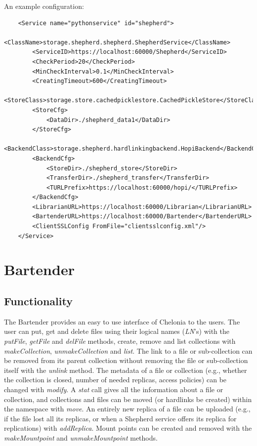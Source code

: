 \documentclass{book}
\begin{document}
An example configuration:

\begin{verbatim}
    <Service name="pythonservice" id="shepherd">
        <ClassName>storage.shepherd.shepherd.ShepherdService</ClassName>
        <ServiceID>https://localhost:60000/Shepherd</ServiceID>
        <CheckPeriod>20</CheckPeriod>
        <MinCheckInterval>0.1</MinCheckInterval>
        <CreatingTimeout>600</CreatingTimeout>
        <StoreClass>storage.store.cachedpicklestore.CachedPickleStore</StoreClass>
        <StoreCfg>
            <DataDir>./shepherd_data1</DataDir>
        </StoreCfg>
        <BackendClass>storage.shepherd.hardlinkingbackend.HopiBackend</BackendClass>
        <BackendCfg>
            <StoreDir>./shepherd_store</StoreDir>
            <TransferDir>./shepherd_transfer</TransferDir>
            <TURLPrefix>https://localhost:60000/hopi/</TURLPrefix>
        </BackendCfg>
        <LibrarianURL>https://localhost:60000/Librarian</LibrarianURL>
        <BartenderURL>https://localhost:60000/Bartender</BartenderURL>
        <ClientSSLConfig FromFile="clientsslconfig.xml"/>
    </Service>    
\end{verbatim}


\newpage

\section{Bartender} %
\label{sec:bartenders}

\subsection{Functionality} %

The Bartender provides an easy to use interface of Chelonia to the users. The user can put, get and delete files using their logical names (\emph{LN}'s) with the \emph{putFile}, \emph{getFile} and \emph{delFile} methods, create, remove and list collections with \emph{makeCollection}, \emph{unmakeCollection} and \emph{list}. The link to a file or sub-collection can be removed from its parent collection without removing the file or sub-collection itself with the \emph{unlink} method. The metadata of a file or collection (e.g., whether the collection is closed, number of needed replicas, access policies) can be changed with \emph{modify}. A \emph{stat} call gives all the information about a file or collection, and collections and files can be moved (or hardlinks be created) within the namespace with \emph{move}. An entirely new replica of a file can be uploaded (e.g., if the file lost all its replicas, or when a Shepherd service offers its replica for replications) with \emph{addReplica}. Mount points can be created and removed with the \emph{makeMountpoint} and \emph{unmakeMountpoint} methods.
\end{document}
